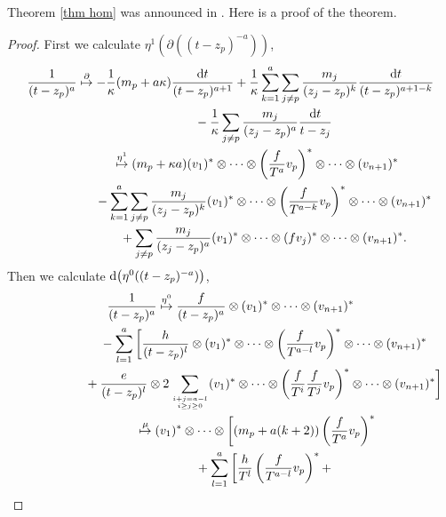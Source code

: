 Theorem \ref{thm hom} was announced in \cite{SV2}. Here is a proof of the theorem.

\begin{proof} First we calculate $ \eta^1(\partial((t-z_p)^{-a}))$,
\begin{gather*}
\frac 1{(t-z_p)^{a}} \overset{\partial} \mapsto -\frac{1}{\kappa}(m_p+a\kappa) \frac{{\rm d}t}{(t-z_p)^{a+1}} +\frac{1}{\kappa} \sum_{k=1}^a \sum_{j\neq p}\frac{m_j}{(z_j-z_p)^k}
\frac{{\rm d}t}{(t-z_p)^{a+1-k}} \nonumber \\
\hphantom{\frac 1{(t-z_p)^{a}} \overset{\partial} \mapsto}{} - \frac{1}{\kappa} \sum_{j\neq p} \frac{m_j}{(z_j-z_p)^a}\frac{{\rm d}t}{t-z_j} \nonumber \\
\hphantom{\frac 1{(t-z_p)^{a}}}{}\overset{\eta^1} \mapsto (m_p+\kappa a) (v_1)^* \otimes\dots\otimes\left(\frac{f}{T^a}v_p \right)^* \otimes\dots\otimes (v_{n+1})^* \nonumber \\
\hphantom{\frac 1{(t-z_p)^{a}} \overset{\partial} \mapsto}{} - \sum_{k=1}^a \sum_{j \neq p}\frac{ m_j}{(z_j-z_p)^k} (v_1)^* \otimes\dots\otimes \left(\frac{f}{T^{a-k}} v_p \right)^* \otimes\dots\otimes (v_{n+1})^* \nonumber\\
\hphantom{\frac 1{(t-z_p)^{a}} \overset{\partial} \mapsto}{} + \sum_{j\neq p}\frac{ m_j}{(z_j-z_p)^a} (v_1)^* \otimes\dots\otimes (fv_j)^* \otimes\dots\otimes (v_{n+1})^*. \nonumber
\end{gather*}
Then we calculate ${\rm d}\big(\eta^0((t-z_p)^{-a})\big)$,
\begin{gather*}
\frac1{(t-z_p)^{a}} \overset{\eta^0}\mapsto \frac{f}{(t-z_p)^a} \otimes (v_1)^* \otimes\dots\otimes (v_{n+1})^* \nonumber \\
\hphantom{\frac1{(t-z_p)^{a}} \overset{\eta^0}\mapsto}{} - \sum_{l=1}^a \bigg[ \frac{h}{(t-z_p)^l} \otimes (v_1)^* \otimes\dots\otimes \left( \frac{f}{T^{a-l}} v_p \right)^* \otimes\dots\otimes (v_{n+1})^*
\nonumber \\
\hphantom{\frac1{(t-z_p)^{a}} \overset{\eta^0}\mapsto}{} + \frac{e}{(t-z_p)^l} \otimes 2 \sum_{i+j = a-l \atop i \geq j \geq 0} (v_1)^* \otimes\dots\otimes \left(\frac{f}{T^i} \frac{f}{T^j} v_p \right)^* \otimes\dots\otimes (v_{n+1})^* \bigg] \nonumber \\
\hphantom{\frac1{(t-z_p)^{a}}}{}
\overset{\mu} \mapsto (v_1)^* \otimes\dots\otimes \bigg[ (m_p + a(k+2)) \left(\frac{f}{T^a} v_p \right)^* \nonumber \\
\hphantom{\frac1{(t-z_p)^{a}} \overset{\eta^0}\mapsto}{} + \sum_{l=1}^a \bigg[\frac{h}{T^l}\left(\frac{f}{T^{a-l}}v_p\right)^*+

\end{gather*}
\end{proof}

